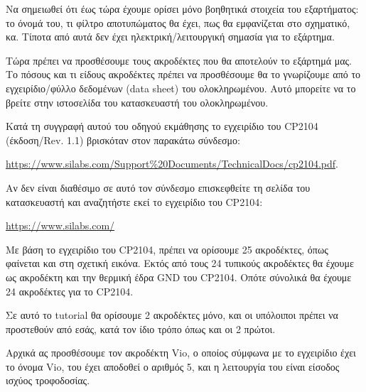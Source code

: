 \documentclass[a4paper]{article}
\begin{document}
\begin{figure}
  \begin{center}
    \label{fig:kicad-main}
  \end{center}
\end{figure}

Να σημειωθεί ότι έως τώρα έχουμε ορίσει μόνο βοηθητικά στοιχεία του εξαρτήματος: το όνομά του, τι φίλτρο αποτυπώματος θα έχει, πως θα εμφανίζεται στο σχηματικό, κα. Τίποτα από αυτά δεν έχει ηλεκτρική/λειτουργική σημασία για το εξάρτημα.

Τώρα πρέπει να προσθέσουμε τους ακροδέκτες που θα αποτελούν το εξάρτημά μας. Το πόσους και τι είδους ακροδέκτες πρέπει να προσθέσουμε θα το γνωρίζουμε από το εγχειρίδιο/φύλλο δεδομένων (data sheet) του ολοκληρωμένου. Αυτό μπορείτε να το βρείτε στην ιστοσελίδα του κατασκευαστή του ολοκληρωμένου. 

Κατά τη συγγραφή αυτού του οδηγού εκμάθησης το εγχειρίδιο του \textenglish{CP2104} (έκδοση/Rev. 1.1) βρισκόταν στον παρακάτω σύνδεσμο:

\href{https://www.silabs.com/Support\%20Documents/TechnicalDocs/cp2104.pdf}{https://www.silabs.com/Support\%20Documents/TechnicalDocs/cp2104.pdf}. 

Αν δεν είναι διαθέσιμο σε αυτό τον σύνδεσμο επισκεφθείτε τη σελίδα του κατασκευαστή και αναζητήστε εκεί το εγχειρίδιο του \textenglish{CP2104}: 

\href{https://www.silabs.com/}{https://www.silabs.com/}

Με βάση το εγχειρίδιο του \textenglish{CP2104}, πρέπει να ορίσουμε 25 ακροδέκτες, όπως φαίνεται και στη σχετική εικόνα. Εκτός από τους 24 τυπικούς ακροδέκτες θα έχουμε ως ακροδέκτη και την θερμική έδρα GND του \textenglish{CP2104}. Οπότε σύνολικά θα έχουμε 24 ακροδέκτες για το \textenglish{CP2104}.

\begin{figure}
  \begin{center}
    \label{fig:kicad-main}
  \end{center}
\end{figure}

Σε αυτό το tutorial θα ορίσουμε 2 ακροδέκτες μόνο, και οι υπόλοιποι πρέπει να προστεθούν από εσάς, κατά τον ίδιο τρόπο όπως και οι 2 πρώτοι.

Αρχικά ας προσθέσουμε τον ακροδέκτη Vio, ο οποίος σύμφωνα με το εγχειρίδιο έχει το όνομα Vio, του έχει αποδοθεί ο αριθμός 5, και η λειτουργία του είναι είσοδος ισχύος τροφοδοσίας.
\end{document}
